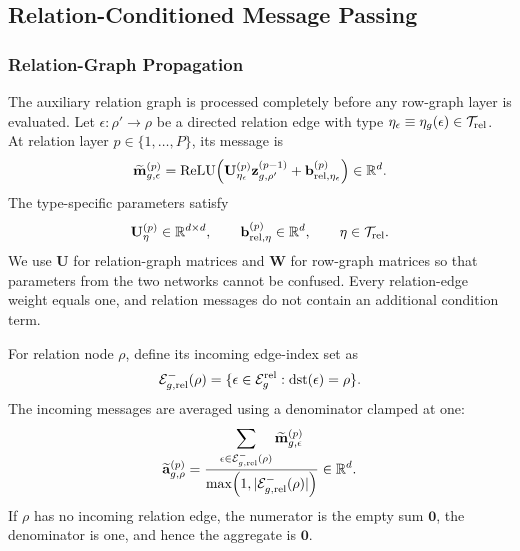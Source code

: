 \subsection{Relation-Conditioned Message Passing}
\label{sec:method:message-passing}

\subsubsection{Relation-Graph Propagation}
\label{sec:method:relation-propagation}

The auxiliary relation graph is processed completely before any row-graph
layer is evaluated. Let \(\epsilon:\rho'\to\rho\) be a directed relation
edge with type
\(\eta_\epsilon\equiv\eta_g(\epsilon)\in\mathcal T_{\mathrm{rel}}\). At
relation layer \(p\in\{1,\ldots,P\}\), its message is
\begin{equation}
  \widetilde{\mathbf m}_{g,\epsilon}^{(p)}
  =
  \operatorname{ReLU}\!\left(
    \mathbf U_{\eta_\epsilon}^{(p)}
    \mathbf z_{g,\rho'}^{(p-1)}
    +\mathbf b_{\mathrm{rel},\eta_\epsilon}^{(p)}
  \right)
  \in\mathbb{R}^d.
\label{eq:method:relation-message}
\end{equation}
The type-specific parameters satisfy
\begin{equation}
  \mathbf U_\eta^{(p)}\in\mathbb{R}^{d\times d},
  \qquad
  \mathbf b_{\mathrm{rel},\eta}^{(p)}\in\mathbb{R}^d,
  \qquad
  \eta\in\mathcal T_{\mathrm{rel}}.
\label{eq:method:relation-edge-parameter-domains}
\end{equation}
We use \(\mathbf U\) for relation-graph matrices and \(\mathbf W\) for
row-graph matrices so that parameters from the two networks cannot be
confused. Every relation-edge weight equals one, and relation messages do
not contain an additional condition term.

For relation node \(\rho\), define its incoming edge-index set as
\begin{equation}
  \mathcal E_{g,\mathrm{rel}}^{-}(\rho)
  =
  \{\epsilon\in\mathcal E_g^{\mathrm{rel}}:\operatorname{dst}(\epsilon)=\rho\}.
\label{eq:method:relation-incoming-edges}
\end{equation}
The incoming messages are averaged using a denominator clamped at one:
\begin{equation}
  \widetilde{\mathbf a}_{g,\rho}^{(p)}
  =
  \frac{
    \displaystyle
    \sum_{\epsilon\in\mathcal E_{g,\mathrm{rel}}^{-}(\rho)}
    \widetilde{\mathbf m}_{g,\epsilon}^{(p)}
  }{
    \displaystyle
    \max\!\left(1,|\mathcal E_{g,\mathrm{rel}}^{-}(\rho)|\right)
  }
  \in\mathbb{R}^d.
\label{eq:method:relation-aggregation}
\end{equation}
If \(\rho\) has no incoming relation edge, the numerator is the empty sum
\(\mathbf0\), the denominator is one, and hence the aggregate is
\(\mathbf0\).

